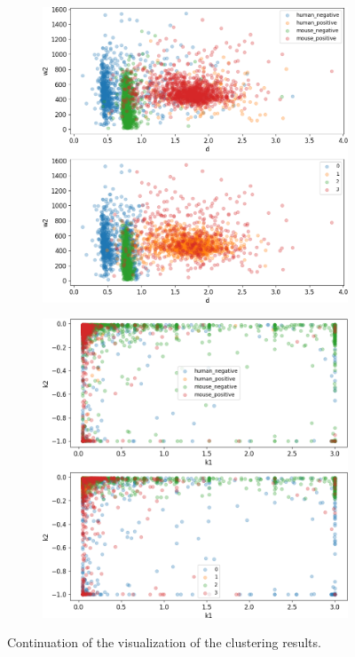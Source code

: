 \begin{figure}
\begin{subfigure}{0.49\textwidth}
	\end{subfigure}
	\hfill
	\begin{subfigure}{0.49\textwidth}
		\includegraphics[width=\textwidth]{fig/seperate_d_w2}
	\end{subfigure}
	\hfill
	\begin{subfigure}{0.49\textwidth}
		\includegraphics[width=\textwidth]{fig/seperate_k1_k2}
	\end{subfigure}
	\caption{Continuation of the visualization of the clustering results.}
\label{fig:vis_output_seperate3}
\end{figure}


